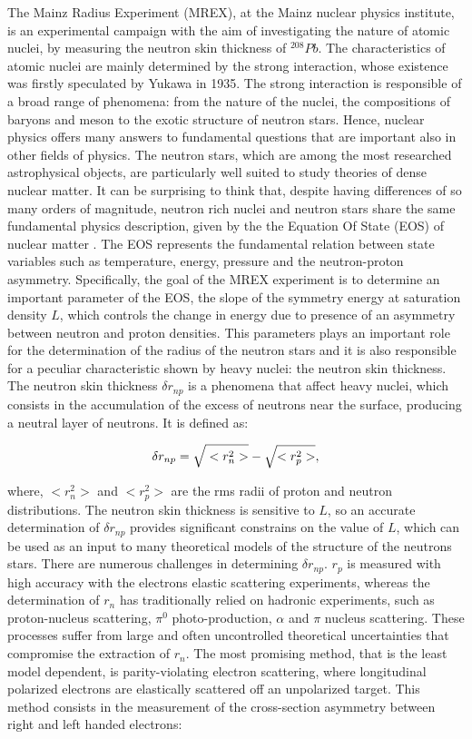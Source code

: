 The Mainz Radius Experiment (MREX), at the Mainz nuclear physics institute, is an experimental campaign with the aim of investigating the nature of atomic nuclei, by measuring the neutron skin thickness of $^{208}Pb$. The characteristics of atomic nuclei are mainly determined by the strong interaction, whose existence was firstly speculated by Yukawa in 1935. The strong interaction is responsible of a broad range of phenomena: from the nature of the nuclei, the compositions of baryons and meson to the exotic structure of neutron stars. Hence, nuclear physics offers many answers to fundamental questions that are important also in other fields of physics. The neutron stars, which are among the most researched astrophysical objects, are particularly well suited to study theories of dense nuclear matter. It can be surprising to think that, despite having differences of so many orders of magnitude, neutron rich nuclei and neutron stars share the same fundamental physics description, given by the the Equation Of State (EOS) of nuclear matter \cite{Thiel_2019}. The EOS represents the fundamental relation between state variables such as temperature, energy, pressure and the neutron-proton asymmetry. Specifically, the goal of the MREX experiment is to determine an important parameter of the EOS, the slope of the symmetry energy at saturation density $L$, which controls the change in energy due to presence of an asymmetry between neutron and proton densities. This parameters plays an important role for the determination of the radius of the neutron stars and it is also responsible for a peculiar characteristic shown by heavy nuclei: the neutron skin thickness. The neutron skin thickness $\delta r_{np}$ is a phenomena that affect heavy nuclei, which consists in the accumulation of the excess of neutrons near the surface, producing a neutral layer of neutrons. It is defined as: 

\begin{equation} \label{eq:NeutronSkin}
\delta r_{np} = \sqrt{\vphantom{r^{2}_{p}}<r^{2}_{n}>} - \sqrt{<r^{2}_{p}>} ,
\end{equation}

where, $<r^{2}_{n}>$ and $<r^{2}_{p}>$ are the rms radii of proton and neutron distributions. The neutron skin thickness is sensitive to $L$, so an accurate determination of $\delta r_{np}$ provides significant constrains on the value of $L$, which can be used as an input to many theoretical models of the structure of the neutrons stars.
There are numerous challenges in determining $\delta r_{np}$. $r_{p}$ is measured with high accuracy with the electrons elastic scattering experiments, whereas the determination of $r_{n}$ has traditionally relied on hadronic experiments, such as proton-nucleus scattering, $\pi^{0}$ photo-production, $\alpha$ and $\pi$ nucleus scattering. These processes suffer from large and often uncontrolled theoretical uncertainties that compromise the extraction of $r_{n}$. The most promising method, that is the least model dependent, is parity-violating electron scattering, where longitudinal polarized electrons are elastically scattered off an unpolarized target. This method consists in the measurement of the cross-section asymmetry between right and left handed electrons:

